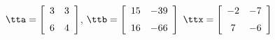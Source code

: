 {$\tta = \left[ \begin {array}{cc} 3&3 \\ \noalign{\medskip} 6&4 \end {array} \right] $, 
 \quad
$\ttb=\left[ \begin {array}{cc} 15&-39\\ \noalign{\medskip} 16&-66  \end {array} \right] $}
{$\ttx=\left[ \begin {array}{cc} -2&-7\\ \noalign{\medskip} 7&-6  \end {array} \right] $}

